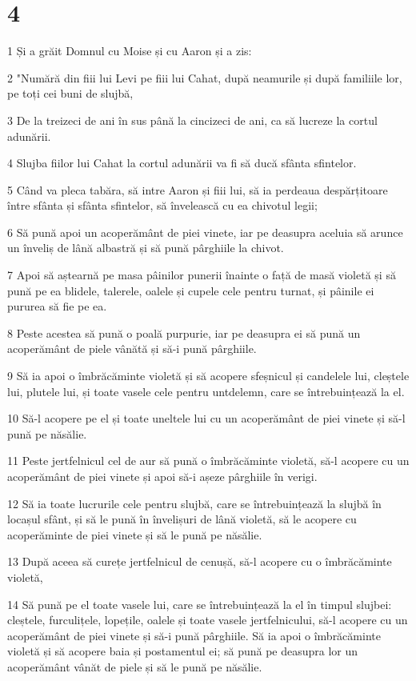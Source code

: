 \chapter{4}

\par 1 Și a grăit Domnul cu Moise și cu Aaron și a zis:
\par 2 "Numără din fiii lui Levi pe fiii lui Cahat, după neamurile și după familiile lor, pe toți cei buni de slujbă,
\par 3 De la treizeci de ani în sus până la cincizeci de ani, ca să lucreze la cortul adunării.
\par 4 Slujba fiilor lui Cahat la cortul adunării va fi să ducă sfânta sfintelor.
\par 5 Când va pleca tabăra, să intre Aaron și fiii lui, să ia perdeaua despărțitoare între sfânta și sfânta sfintelor, să învelească cu ea chivotul legii;
\par 6 Să pună apoi un acoperământ de piei vinete, iar pe deasupra aceluia să arunce un înveliș de lână albastră și să pună pârghiile la chivot.
\par 7 Apoi să aștearnă pe masa pâinilor punerii înainte o față de masă violetă și să pună pe ea blidele, talerele, oalele și cupele cele pentru turnat, și pâinile ei pururea să fie pe ea.
\par 8 Peste acestea să pună o poală purpurie, iar pe deasupra ei să pună un acoperământ de piele vânătă și să-i pună pârghiile.
\par 9 Să ia apoi o îmbrăcăminte violetă și să acopere sfeșnicul și candelele lui, cleștele lui, plutele lui, și toate vasele cele pentru untdelemn, care se întrebuințează la el.
\par 10 Să-l acopere pe el și toate uneltele lui cu un acoperământ de piei vinete și să-l pună pe năsălie.
\par 11 Peste jertfelnicul cel de aur să pună o îmbrăcăminte violetă, să-l acopere cu un acoperământ de piei vinete și apoi să-i așeze pârghiile în verigi.
\par 12 Să ia toate lucrurile cele pentru slujbă, care se întrebuințează la slujbă în locașul sfânt, și să le pună în învelișuri de lână violetă, să le acopere cu acoperăminte de piei vinete și să le pună pe năsălie.
\par 13 După aceea să curețe jertfelnicul de cenușă, să-l acopere cu o îmbrăcăminte violetă,
\par 14 Să pună pe el toate vasele lui, care se întrebuințează la el în timpul slujbei: cleștele, furculițele, lopețile, oalele și toate vasele jertfelnicului, să-l acopere cu un acoperământ de piei vinete și să-i pună pârghiile. Să ia apoi o îmbrăcăminte violetă și să acopere baia și postamentul ei; să pună pe deasupra lor un acoperământ vânăt de piele și să le pună pe năsălie.
